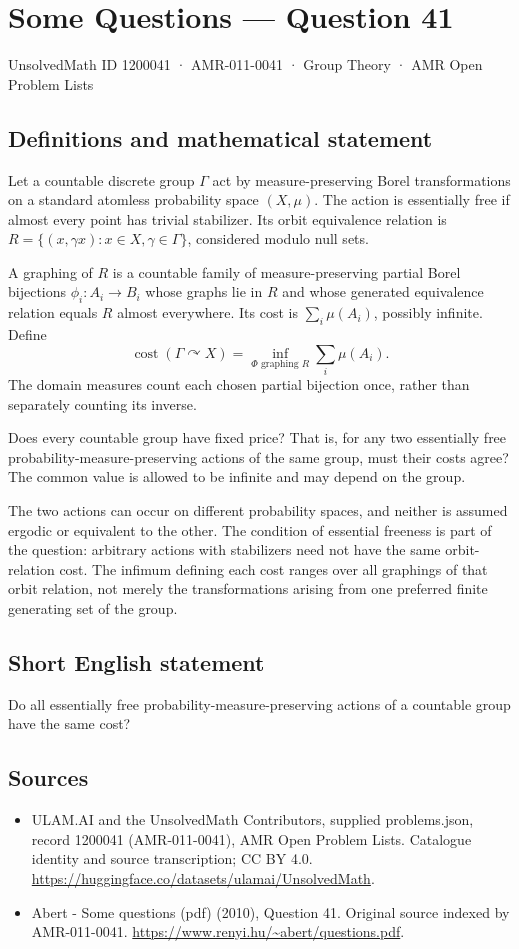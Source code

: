 \documentclass[11pt,a4paper]{article}
\begin{document}
\section*{Some Questions — Question 41}\label{1200041}
{\small UnsolvedMath ID 1200041 · AMR-011-0041 · Group Theory · AMR Open Problem Lists}
\subsection{Definitions and mathematical statement}
Let a countable discrete group $\Gamma$ act by measure-preserving Borel transformations on a standard atomless probability space $(X,\mu)$. The action is essentially free if almost every point has trivial stabilizer. Its orbit equivalence relation is $R=\{(x,\gamma x):x\in X,\gamma\in\Gamma\}$, considered modulo null sets.

A graphing of $R$ is a countable family of measure-preserving partial Borel bijections $\phi_i:A_i\to B_i$ whose graphs lie in $R$ and whose generated equivalence relation equals $R$ almost everywhere. Its cost is $\sum_i\mu(A_i)$, possibly infinite. Define
\[
 \operatorname{cost}(\Gamma\curvearrowright X)
   =\inf_{\Phi\text{ graphing }R}\sum_i\mu(A_i).
\]
The domain measures count each chosen partial bijection once, rather than separately counting its inverse.

Does every countable group have fixed price? That is, for any two essentially free probability-measure-preserving actions of the same group, must their costs agree? The common value is allowed to be infinite and may depend on the group.

The two actions can occur on different probability spaces, and neither is assumed ergodic or equivalent to the other. The condition of essential freeness is part of the question: arbitrary actions with stabilizers need not have the same orbit-relation cost. The infimum defining each cost ranges over all graphings of that orbit relation, not merely the transformations arising from one preferred finite generating set of the group.
\subsection{Short English statement}
Do all essentially free probability-measure-preserving actions of a countable group have the same cost?
\subsection{Sources}
\begin{itemize}
\item[S1] ULAM.AI and the UnsolvedMath Contributors, supplied problems.json, record 1200041 (AMR-011-0041), AMR Open Problem Lists. Catalogue identity and source transcription; CC BY 4.0.
\url{https://huggingface.co/datasets/ulamai/UnsolvedMath}.
\item[S2] Abert - Some questions (pdf) (2010), Question 41. Original source indexed by AMR-011-0041.
\url{https://www.renyi.hu/~abert/questions.pdf}.
\end{itemize}
\end{document}
